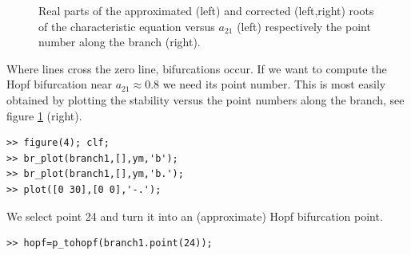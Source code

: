 \documentclass[10pt]{article}
\begin{document}
{\begin{figure}[h]
\begin{center}
\end{center}
\caption{\small\label{ride3+4_pic}Real parts of
the approximated (left) and corrected (left,right)
roots of the characteristic equation
versus $a_{21}$ (left) respectively the point number along the branch
(right).} 
\end{figure}
Where lines cross the zero line, bifurcations occur. If we want to 
compute the Hopf bifurcation near $a_{21}\approx0.8$ we need its point
number. This is most easily obtained by plotting the stability versus
the point numbers along the branch, see figure \ref{ride3+4_pic} (right).
{\small\begin{verbatim}
>> figure(4); clf;
>> br_plot(branch1,[],ym,'b');
>> br_plot(branch1,[],ym,'b.');
>> plot([0 30],[0 0],'-.');
\end{verbatim}}
We select point 24 and turn it into an (approximate) Hopf bifurcation point.
{\small\begin{verbatim}
>> hopf=p_tohopf(branch1.point(24));
\end{verbatim}}
\begin{figure}[h]
\begin{center}

\end{center}
\end{figure}}
\end{document}
